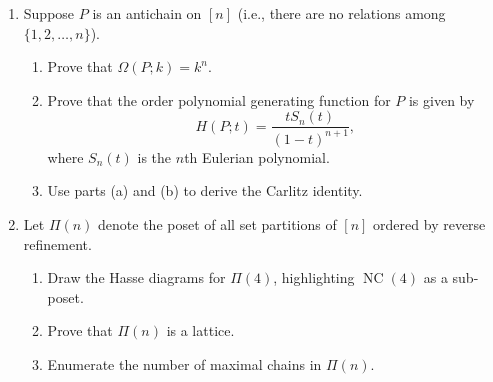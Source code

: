 \documentclass[11pt]{article}%
\theoremstyle{definition}
\DeclareMathOperator{\NC}{NC}
\begin{document}
\begin{enumerate}
\item Suppose $P$ is an antichain on $[n]$ (i.e., there are no relations among $\{1,2,\ldots,n\}$).
\begin{enumerate}
\item Prove that $\Omega(P;k)=k^n$.
\item Prove that the order polynomial generating function for $P$ is given by
\[
H(P;t)=\frac{tS_n(t)}{(1-t)^{n+1}},
\]
where $S_n(t)$ is the $n$th Eulerian polynomial.
\item Use parts (a) and (b) to derive the Carlitz identity.
\end{enumerate}

\item Let $\Pi(n)$ denote the poset of all set partitions of $[n]$ ordered by reverse refinement.
\begin{enumerate}
\item Draw the Hasse diagrams for $\Pi(4)$, highlighting $\NC(4)$ as a sub-poset.
\item Prove that $\Pi(n)$ is a lattice.
\item Enumerate the number of maximal chains in $\Pi(n)$.
\end{enumerate}

\end{enumerate}
\end{document}
